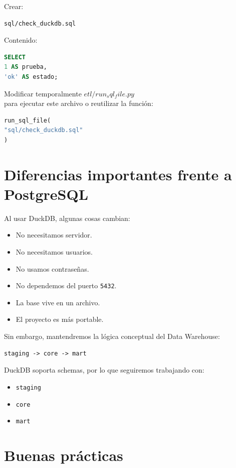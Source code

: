 Crear:

\begin{verbatim}
sql/check_duckdb.sql
\end{verbatim}

Contenido:

\begin{lstlisting}[language=SQL]
SELECT
1 AS prueba,
'ok' AS estado;
\end{lstlisting}

Modificar temporalmente $etl/run_sql_file.py$ \\
para ejecutar este archivo o reutilizar la función:

\begin{lstlisting}[language=Python]
run_sql_file(
"sql/check_duckdb.sql"
)
\end{lstlisting}

\section{Diferencias importantes frente a PostgreSQL}

Al usar DuckDB, algunas cosas cambian:

\begin{itemize}
\item No necesitamos servidor.
\item No necesitamos usuarios.
\item No usamos contraseñas.
\item No dependemos del puerto \texttt{5432}.
\item La base vive en un archivo.
\item El proyecto es más portable.
\end{itemize}

Sin embargo, mantendremos la lógica conceptual del Data Warehouse:

\begin{verbatim}
staging -> core -> mart
\end{verbatim}

DuckDB soporta schemas, por lo que seguiremos trabajando con:

\begin{itemize}
\item \texttt{staging}
\item \texttt{core}
\item \texttt{mart}
\end{itemize}

\section{Buenas prácticas}

